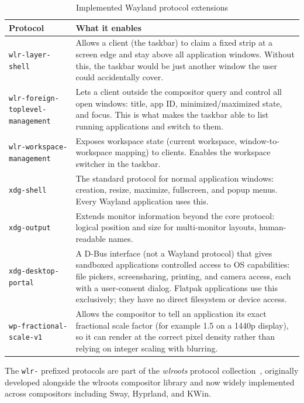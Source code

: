 \begin{table}[htbp]
\caption{Implemented Wayland protocol extensions}
\label{tab:wayland-protocols}
\begin{tabularx}{\linewidth}{lX}
\toprule
\textbf{Protocol} & \textbf{What it enables} \\
\midrule
\texttt{wlr-layer-shell}~\cite{wlr:protocols} &
  Allows a client (the taskbar) to claim a fixed strip at a screen edge and
  stay above all application windows. Without this, the taskbar would be
  just another window the user could accidentally cover. \\
\texttt{wlr-foreign-toplevel-management}~\cite{wlr:protocols} &
  Lets a client outside the compositor query and control all open windows:
  title, app ID, minimized/maximized state, and focus. This is what makes the
  taskbar able to list running applications and switch to them. \\
\texttt{wlr-workspace-management}~\cite{wlr:protocols} &
  Exposes workspace state (current workspace, window-to-workspace mapping) to
  clients. Enables the workspace switcher in the taskbar. \\
\texttt{xdg-shell} &
  The standard protocol for normal application windows: creation, resize,
  maximize, fullscreen, and popup menus. Every Wayland application uses this. \\
\texttt{xdg-output} &
  Extends monitor information beyond the core protocol: logical position and
  size for multi-monitor layouts, human-readable names. \\
\texttt{xdg-desktop-portal}~\cite{xdg:portal} &
  A D-Bus interface (not a Wayland protocol) that gives sandboxed applications
  controlled access to OS capabilities: file pickers, screensharing, printing,
  and camera access, each with a user-consent dialog. Flatpak applications use
  this exclusively; they have no direct filesystem or device access. \\
\texttt{wp-fractional-scale-v1} &
  Allows the compositor to tell an application its exact fractional scale
  factor (for example 1.5 on a 1440p display), so it can render at the correct
  pixel density rather than relying on integer scaling with blurring. \\
\bottomrule
\end{tabularx}
\end{table}

The \texttt{wlr-} prefixed protocols are part of the \emph{wlroots} protocol
collection~\cite{wlr:protocols}, originally developed alongside the wlroots
compositor library and now widely implemented across compositors including
Sway, Hyprland, and KWin.

